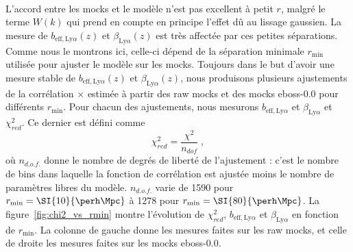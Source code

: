 \paragraph{}
  L'accord entre les mocks et le modèle n'est pas excellent  à petit $r$, malgré le terme $W(k)$ qui prend en compte en principe l'effet dû au lissage gaussien.
  La mesure de $b_{\mathrm{eff},\mathrm{Ly}\alpha}(z)$ et $\beta_{\mathrm{Ly}\alpha}(z)$ est très affectée par ces petites séparations. Comme nous le montrons ici, celle-ci dépend de la séparation minimale $r_{\mathrm{min}}$ utilisée pour ajuster le modèle sur les mocks.
Toujours dans le but d'avoir une mesure stable de $b_{\mathrm{eff},\mathrm{Ly}\alpha}(z)$ et $\beta_{\mathrm{Ly}\alpha}(z)$, nous produisons plusieurs ajustements de la corrélation \lya{}$\times$\lya{} estimée à partir des raw mocks et des mocks eboss-0.0 pour différents $r_{\mathrm{min}}$. 
Pour chacun des ajustements, nous mesurons $b_{\mathrm{eff},\mathrm{Ly}\alpha}$ et $\beta_{\mathrm{Ly}\alpha}$ et $\chi_{red}^2$. Ce dernier est défini comme
\begin{equation}
  \label{eq:chi2_red}
  \chi_{red}^2 = \frac{\chi^2}{n_{dof}} \; ,
\end{equation}
où $n_{d.o.f.}$ donne le nombre de degrés de liberté de l'ajustement : c'est le nombre de bins dans laquelle la fonction de corrélation est ajustée moins le nombre de paramètres libres du modèle.
$n_{d.o.f.}$ varie de \num{1590} pour $r_{\mathrm{min}} = \SI{10}{\perh\Mpc}$ à \num{1278} pour $r_{\mathrm{min}} = \SI{80}{\perh\Mpc}$.
La figure~\ref{fig:chi2_vs_rmin} montre l'évolution de $\chi_{red}^2$, $b_{\mathrm{eff},\mathrm{Ly}\alpha}$ et $\beta_{\mathrm{Ly}\alpha}$ en fonction de $r_{\mathrm{min}}$.
La colonne de gauche donne les mesures faites sur les raw mocks, et celle de droite les mesures faites sur les mocks eboss-0.0.
